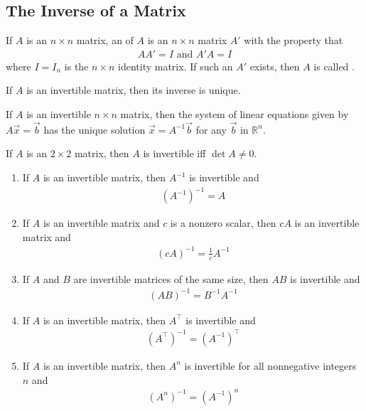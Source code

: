 \documentclass{article}
\begin{document}
\subsection{The Inverse of a Matrix}
\begin{definition}
    If $A$ is an $n\times n$ matrix, an  of $A$ is an $n\times n$ matrix $A'$ with the property that
    \begin{gather*}
        AA'=I\text{  and  } A'A = I 
    \end{gather*}
    where $I = I_n$ is the $n\times n$ identity matrix. If such an $A'$ exists, then $A$ is called .
\end{definition}
\begin{theorem}
    If $A$ is an invertible matrix, then its inverse is unique.
\end{theorem}
\begin{theorem}
    If $A$ is an invertible $n\times n$ matrix, then the system of linear equations given by $A\vec x = \vec b$ has the unique solution $\vec x = A^{-1}\vec b$ for any $\vec b$ in $\mathbb{R}^n$.
\end{theorem}
\begin{theorem}
    If $A$ is an $2\times 2$ matrix, then $A$ is invertible iff $\det A \not= 0$.
\end{theorem}
\begin{theorem}
    \begin{enumerate}
        \item If $A$ is an invertible matrix, then $A^{-1}$ is invertible and
        \begin{gather*}
            (A^{-1})^{-1} = A
        \end{gather*}
        \item If $A$ is an invertible matrix and $c$ is a nonzero scalar, then $cA$ is an invertible matrix and \begin{gather*}
            (cA)^{-1} = \frac{1}{c}A^{-1}
        \end{gather*}
        \item If $A$ and $B$ are invertible matrices of the same size, then $AB$ is invertible and \begin{gather*}
            (AB)^{-1} = B^{-1} A^{-1}
        \end{gather*}
        \item If $A$ is an invertible matrix, then $A^\intercal$ is invertible and \begin{gather*}
            (A^\intercal)^{-1}=(A^{-1})^\intercal
        \end{gather*}
        \item If $A$ is an invertible matrix, then $A^n$ is invertible for all nonnegative integers $n$ and \begin{gather*}
            (A^n)^{-1} = (A^{-1})^n
        \end{gather*}
    \end{enumerate}
\end{theorem}
\end{document}
